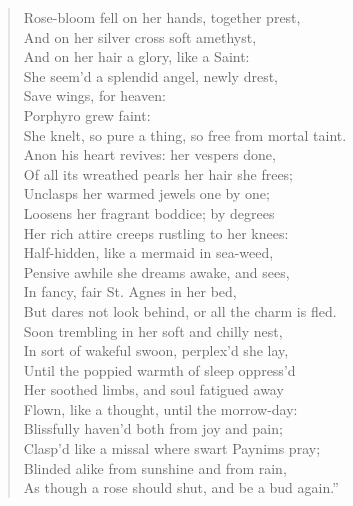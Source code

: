 \begin{verse}
  Rose-bloom fell on her hands, together prest,\\
  And on her silver cross soft amethyst, \\
  And on her hair a glory, like a Saint: \\
  She seem'd a splendid angel, newly drest, \\
  Save wings, for heaven:\textemdash \\
  Porphyro grew faint: \\
  She knelt, so pure a thing, so free from mortal taint.\\
\vspace{\stanzaskip}
  Anon his heart revives: her vespers done, \\
  Of all its wreathed pearls her hair she frees; \\
  Unclasps her warmed jewels one by one; \\
  Loosens her fragrant boddice; by degrees \\
  Her rich attire creeps rustling to her knees: \\
  Half-hidden, like a mermaid in sea-weed, \\
  Pensive awhile she dreams awake, and sees, \\
  In fancy, fair St. Agnes in her bed, \\
  But dares not look behind, or all the charm is fled.\\
\vspace{\stanzaskip}
Soon trembling in her soft and chilly nest, \\
In sort of wakeful swoon, perplex'd she lay, \\
Until the poppied warmth of sleep oppress'd \\
Her soothed limbs, and soul fatigued away \\
Flown, like a thought, until the morrow-day: \\
Blissfully haven'd both from joy and pain; \\
Clasp'd like a missal where swart Paynims pray;\\
Blinded alike from sunshine and from rain, \\
As though a rose should shut, and be a bud again.''
\end{verse}

